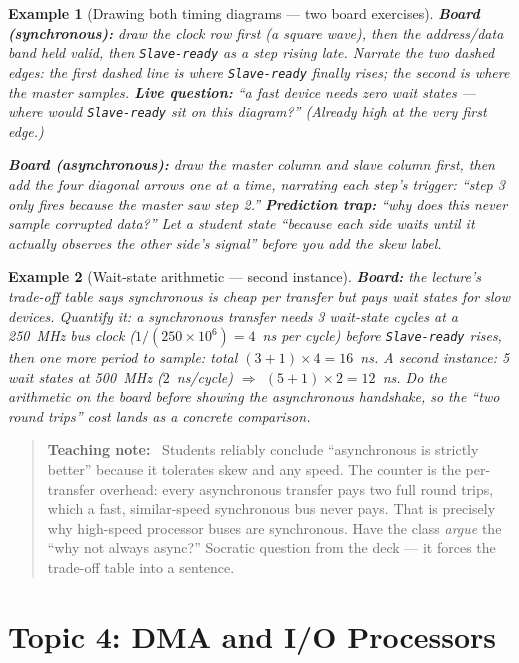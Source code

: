 \documentclass[11pt]{article}
\newtheorem{example}{Example}[section]
\newenvironment{teachingaside}{\begin{quote}\small\color{primary-gold}\textbf{Teaching note:}\ }{\end{quote}}
\begin{document}
\begin{example}[Drawing both timing diagrams --- two board exercises]
\label{ex:busboard}
\textbf{Board (synchronous):} draw the clock row first (a square wave), then the address/data band held valid, then \texttt{Slave-ready} as a step rising late. Narrate the two dashed edges: the first dashed line is where \texttt{Slave-ready} finally rises; the second is where the master samples. \textbf{Live question:} ``a fast device needs zero wait states --- where would \texttt{Slave-ready} sit on this diagram?'' (Already high at the very first edge.)

\textbf{Board (asynchronous):} draw the master column and slave column first, then add the four diagonal arrows \emph{one at a time}, narrating each step's trigger: ``step 3 only fires because the master \emph{saw} step 2.'' \textbf{Prediction trap:} ``why does this never sample corrupted data?'' Let a student state ``because each side waits until it actually observes the other side's signal'' before you add the skew label.
\end{example}

\begin{example}[Wait-state arithmetic --- second instance]
\label{ex:waitstates}
\textbf{Board:} the lecture's trade-off table says synchronous is cheap per transfer but pays wait states for slow devices. Quantify it: a synchronous transfer needs 3 wait-state cycles at a 250~MHz bus clock ($1/(250\times10^6)=4$~ns per cycle) before \texttt{Slave-ready} rises, then one more period to sample: total $(3+1)\times4=16$~ns. A second instance: 5 wait states at 500~MHz ($2$~ns/cycle) $\Rightarrow$ $(5+1)\times2=12$~ns. Do the arithmetic on the board \emph{before} showing the asynchronous handshake, so the ``two round trips'' cost lands as a concrete comparison.
\end{example}

\begin{teachingaside}
Students reliably conclude ``asynchronous is strictly better'' because it tolerates skew and any speed. The counter is the per-transfer overhead: every asynchronous transfer pays two full round trips, which a fast, similar-speed synchronous bus never pays. That is precisely why high-speed processor buses are synchronous. Have the class \emph{argue} the ``why not always async?'' Socratic question from the deck --- it forces the trade-off table into a sentence.
\end{teachingaside}

\section{Topic 4: DMA and I/O Processors}
\end{document}
